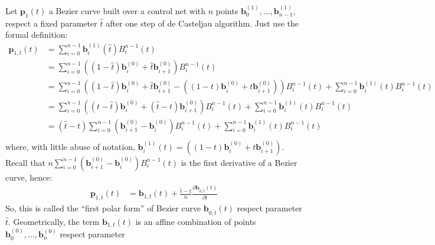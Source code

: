 \documentclass{article}
\begin{document}
Let $\mathbf{p}_{1}(t)$ a Bezier curve built over a control net with $n$ points
$\mathbf{b}_{0}^{(1)},\ldots,\mathbf{b}_{n-1}^{(1)}$, respect a fixed parameter $\hat{t}$
after one step of de Casteljau algorithm. Just use the formal definition:
\begin{displaymath}
    \begin{split}
        \mathbf{p}_{1,\hat{t}}(t)  &= \sum_{i=0}^{n-1}{\mathbf{b}_{i}^{(1)}(\hat{t})B_{i}^{n-1}(t)} \\
            &=  \sum_{i=0}^{n-1}{\left( (1-\hat{t})\mathbf{b}_{i}^{(0)} + 
                \hat{t}\mathbf{b}_{i+1}^{(0)}\right)B_{i}^{n-1}(t)} \\
            &=  \sum_{i=0}^{n-1}{\left( (1-\hat{t})\mathbf{b}_{i}^{(0)} + 
                \hat{t}\mathbf{b}_{i+1}^{(0)} -\left( (1-t)\mathbf{b}_{i}^{(0)} + 
                t\mathbf{b}_{i+1}^{(0)}\right)\right)B_{i}^{n-1}(t)} + 
                \sum_{i=0}^{n-1}{\mathbf{b}_{i}^{(1)}(t)B_{i}^{n-1}(t)} \\
            &=  \sum_{i=0}^{n-1}{\left( (t-\hat{t})\mathbf{b}_{i}^{(0)} + 
                (\hat{t}-t)\mathbf{b}_{i+1}^{(0)}\right)B_{i}^{n-1}(t)} + 
                \sum_{i=0}^{n-1}{\mathbf{b}_{i}^{(1)}(t)B_{i}^{n-1}(t)} \\
            &=  (\hat{t}-t)\sum_{i=0}^{n-1}{\left( 
                \mathbf{b}_{i+1}^{(0)} - \mathbf{b}_{i}^{(0)}\right)B_{i}^{n-1}(t)} + 
                \sum_{i=0}^{n-1}{\mathbf{b}_{i}^{(1)}(t)B_{i}^{n-1}(t)} \\
    \end{split}
\end{displaymath}
where, with little abuse of notation, $\mathbf{b}_{i}^{(1)}(t) = 
\left( (1-t)\mathbf{b}_{i}^{(0)} + t\mathbf{b}_{i+1}^{(0)}\right)$.
Recall that $n\sum_{i=0}^{n-1}{\left( 
\mathbf{b}_{i+1}^{(0)} - \mathbf{b}_{i}^{(0)}\right)B_{i}^{n-1}(t)}$ is the
first derivative of a Bezier curve, hence:
\begin{displaymath}
    \begin{split}
        \mathbf{p}_{1, \hat{t}}(t)  &= \mathbf{b}_{1, t}(t) + 
        \frac{\hat{t}-t}{n}\frac{\partial \mathbf{b}_{0, \hat{t}}(t) }{\partial t} 
    \end{split}
\end{displaymath}
So, this is called the ``first polar form'' of Bezier curve $\mathbf{b}_{0, \hat{t}}(t)$
respect parameter $\hat{t}$. Geometrically, the term $\mathbf{b}_{1, t}(t)$ is an affine
combination of points $\mathbf{b}_{0}^{(0)},\ldots,\mathbf{b}_{n}^{(0)}$ respect parameter
\end{document}
